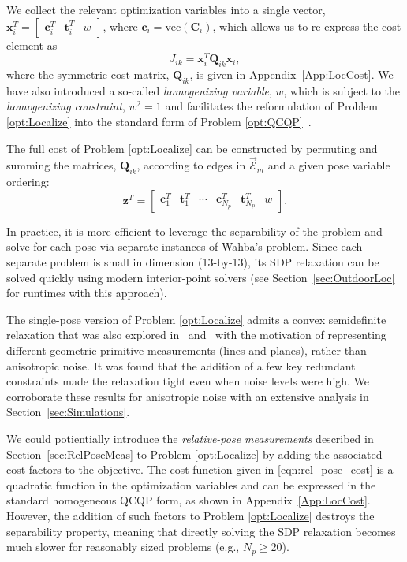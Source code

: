 \documentclass[lettersize,journal]{IEEEtran}
\newcommand{\EdgeSet}{\vec{\bm{\mathcal{E}}}}
\newcommand{\vect}[1]{\mbox{vec}(#1)}
\begin{document}
We collect the relevant optimization variables into a single vector, $ \bm{x}_i^T = \begin{bmatrix} \bm{c}_i^T &  \bm{t}_i^T & w \end{bmatrix} $, where $ \bm{c}_i=\vect{\bm{C}_i} $, which allows us to re-express the cost element as
\begin{equation}
	J_{ik}= \bm{x}_i^T\bm{Q}_{ik}\bm{x}_i,
\end{equation}
where the symmetric cost matrix, $\bm{Q}_{ik}$, is given in Appendix~\ref{App:LocCost}. We have also introduced a so-called \textit{homogenizing variable}, $ w $, which is subject to the \textit{homogenizing constraint}, $ w^2 = 1 $ and facilitates the reformulation of Problem \eqref{opt:Localize} into the standard form of Problem \eqref{opt:QCQP}~\cite{wiseCertifiablyOptimalMonocular2020, cifuentesLocalStabilitySemidefinite2022}.

The full cost of Problem \eqref{opt:Localize} can be constructed by permuting and summing the matrices, $\bm{Q}_{ik}$, according to edges in $\EdgeSet_m$ and a given pose variable ordering:
\begin{equation}\label{eqn:locVar}
	\bm{z}^T = \begin{bmatrix}
		\bm{c}_{1}^T & \bm{t}_1^T & \cdots &  \bm{c}_{N_p}^T & \bm{t}_{N_p}^{T} & w
	\end{bmatrix}.
\end{equation}

In practice, it is more efficient to leverage the separability of the problem and solve for each pose via separate instances of Wahba's problem. Since each separate problem is small in dimension (13-by-13), its SDP relaxation can be solved quickly using modern interior-point solvers (see Section~\ref{sec:OutdoorLoc} for runtimes with this approach).

The single-pose version of Problem \eqref{opt:Localize} admits a convex semidefinite relaxation that was also explored in~\cite{brialesConvexGlobal3D2017} and~\cite{olssonSolvingQuadraticallyConstrained2008} with the motivation of representing different geometric primitive measurements (lines and planes), rather than anisotropic noise. It was found that the addition of a few key redundant constraints made the relaxation tight even when noise levels were high. We corroborate these results for anisotropic noise with an extensive analysis in Section~\ref{sec:Simulations}.

We could potientially introduce the \textit{relative-pose measurements} described in Section~\ref{sec:RelPoseMeas} to Problem \eqref{opt:Localize} by adding the associated cost factors to the objective. The cost function given in \eqref{eqn:rel_pose_cost} is a quadratic function in the optimization variables and can be expressed in the standard homogeneous QCQP form, as shown in Appendix~\ref{App:LocCost}. However, the addition of such factors to Problem \eqref{opt:Localize} destroys the separability property, meaning that directly solving the SDP relaxation becomes much slower for reasonably sized problems (e.g., $N_p \geq 20$).
\end{document}
